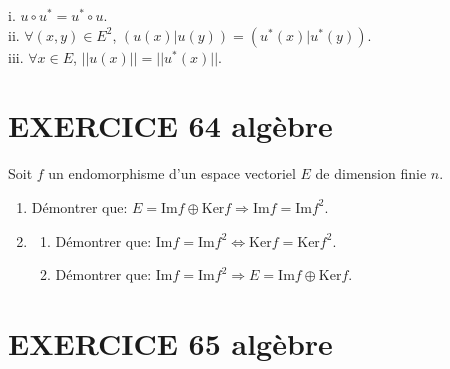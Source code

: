 \documentclass[10pt,oneside]{article}
\begin{document}
\begin{flushleft}
\begin{enumerate}
i.\: $u\circ u^*=u^*\circ u$.\\
ii.\: $\forall (x,y)\in E^2$, $(u(x)|u(y))=(u^*(x)|u^*(y))$.\\
iii.\: $\forall x\in E$, $||u(x)||=||u^*(x)||$.
\end{enumerate}








\section*{EXERCICE 64 \: algèbre }


Soit $f$ un endomorphisme d'un espace vectoriel $E$ de dimension finie $n$.
\begin{enumerate}
\item Démontrer que: $E=\text{Im} f \oplus \mathrm{Ker} f \Longrightarrow \text{Im} f = \text{Im} f^2$.\:\:\:\:

\item \begin{enumerate}
	\item Démontrer que: $\text{Im} f = \text{Im} f^2 \Longleftrightarrow \mathrm{Ker} f = \mathrm{Ker} f^2$.\:\:\:\:
	\item Démontrer que: $\text{Im} f = \text{Im} f^2 \Longrightarrow E=\text{Im} f \oplus \mathrm{Ker} f$.\:\:\:\:
	\end{enumerate}
\end{enumerate}
\section*{EXERCICE 65 \: algèbre }


\end{flushleft}
\end{document}
